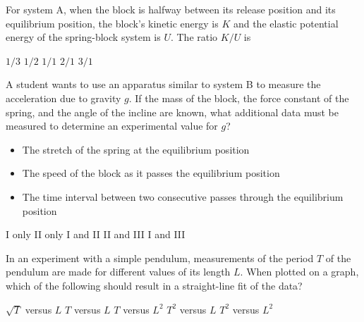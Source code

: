 \documentclass[12pt]{../../oss-apphys-exam}
\begin{document}
\begin{questions}
  \question For system A, when the block is halfway between its release
  position and its equilibrium position, the block's kinetic energy is $K$ and
  the elastic potential energy of the spring-block system is $U$. The ratio
  $K/U$ is
  \begin{choices}
    \choice $1/3$
    \choice $1/2$
    \choice $1/1$
    \choice $2/1$
    \choice $3/1$
  \end{choices}
  \question A student wants to use an apparatus similar to system B to measure
  the acceleration due to gravity $g$. If the mass of the block, the force
  constant of the spring, and the angle of the incline are known, what
  additional data must be measured to determine an experimental value for $g$?
  \label{spring2}
  \begin{itemize}[nosep]
    \item[I.] The stretch of the spring at the equilibrium position
    \item[II.] The speed of the block as it passes the equilibrium position
    \item[III.] The time interval between two consecutive passes through the
      equilibrium position
  \end{itemize}
  \begin{choices}
    \choice I only
    \choice II only
    \choice I and II
    \choice II and III
    \choice I and III
  \end{choices}
  \newpage
  
  \question In an experiment with a simple pendulum, measurements of the period
  $T$ of the pendulum are made for different values of its length $L$.
  When plotted on a graph, which of the following should result in a
  straight-line fit of the data?
  \begin{choices}
    \choice $\sqrt T$ versus $L$
    \choice $T$ versus $L$
    \choice $T$ versus $L^2$
    \choice $T^2$ versus $L$
    \choice $T^2$ versus $L^2$
  \end{choices}
  \newpage
  

\end{questions}
\end{document}
